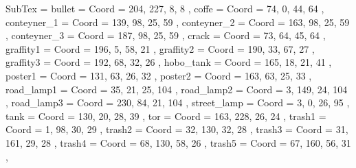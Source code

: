 SubTex = {
	bullet								= { Coord = { 204, 227, 8, 8 } },
	coffe								= { Coord = { 74, 0, 44, 64 } },
	conteyner_1								= { Coord = { 139, 98, 25, 59 } },
	conteyner_2								= { Coord = { 163, 98, 25, 59 } },
	conteyner_3								= { Coord = { 187, 98, 25, 59 } },
	crack								= { Coord = { 73, 64, 45, 64 } },
	graffity1								= { Coord = { 196, 5, 58, 21 } },
	graffity2								= { Coord = { 190, 33, 67, 27 } },
	graffity3								= { Coord = { 192, 68, 32, 26 } },
	hobo_tank								= { Coord = { 165, 18, 21, 41 } },
	poster1								= { Coord = { 131, 63, 26, 32 } },
	poster2								= { Coord = { 163, 63, 25, 33 } },
	road_lamp1								= { Coord = { 35, 21, 25, 104 } },
	road_lamp2								= { Coord = { 3, 149, 24, 104 } },
	road_lamp3								= { Coord = { 230, 84, 21, 104 } },
	street_lamp								= { Coord = { 3, 0, 26, 95 } },
	tank								= { Coord = { 130, 20, 28, 39 } },
	tor								= { Coord = { 163, 228, 26, 24 } },
	trash1								= { Coord = { 1, 98, 30, 29 } },
	trash2								= { Coord = { 32, 130, 32, 28 } },
	trash3								= { Coord = { 31, 161, 29, 28 } },
	trash4								= { Coord = { 68, 130, 58, 26 } },
	trash5								= { Coord = { 67, 160, 56, 31 } },
}
